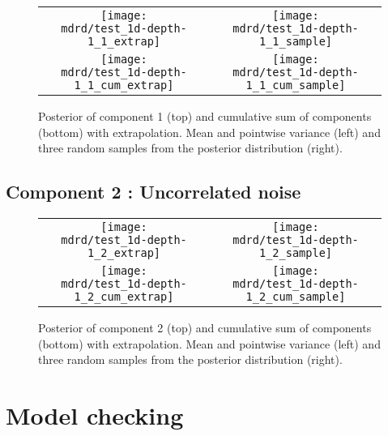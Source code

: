 \documentclass{article} %
\begin{document}
\begin{figure}[H]
\newcommand{\wmgd}{0.5\columnwidth}
\newcommand{\hmgd}{3.0cm}
\newcommand{\mdrd}{test_1d-depth-1}
\newcommand{\mbm}{\hspace{-0.3cm}}
\begin{tabular}{cc}
\mbm \texttt{[image: \\mdrd/test\_1d-depth-1\_1\_extrap]} & \texttt{[image: \\mdrd/test\_1d-depth-1\_1\_sample]} \\
\mbm \texttt{[image: \\mdrd/test\_1d-depth-1\_1\_cum\_extrap]} & \texttt{[image: \\mdrd/test\_1d-depth-1\_1\_cum\_sample]}
\end{tabular}
\caption{Posterior of component 1 (top) and cumulative sum of components (bottom) with extrapolation. Mean and pointwise variance (left) and three random samples from the posterior distribution (right).}
\label{fig:extrap1}
\end{figure}

\subsection{Component 2 : Uncorrelated noise}



\begin{figure}[H]
\newcommand{\wmgd}{0.5\columnwidth}
\newcommand{\hmgd}{3.0cm}
\newcommand{\mdrd}{test_1d-depth-1}
\newcommand{\mbm}{\hspace{-0.3cm}}
\begin{tabular}{cc}
\mbm \texttt{[image: \\mdrd/test\_1d-depth-1\_2\_extrap]} & \texttt{[image: \\mdrd/test\_1d-depth-1\_2\_sample]} \\
\mbm \texttt{[image: \\mdrd/test\_1d-depth-1\_2\_cum\_extrap]} & \texttt{[image: \\mdrd/test\_1d-depth-1\_2\_cum\_sample]}
\end{tabular}
\caption{Posterior of component 2 (top) and cumulative sum of components (bottom) with extrapolation. Mean and pointwise variance (left) and three random samples from the posterior distribution (right).}
\label{fig:extrap2}
\end{figure}

\section{Model checking}
\label{sec:check}
\end{document}
